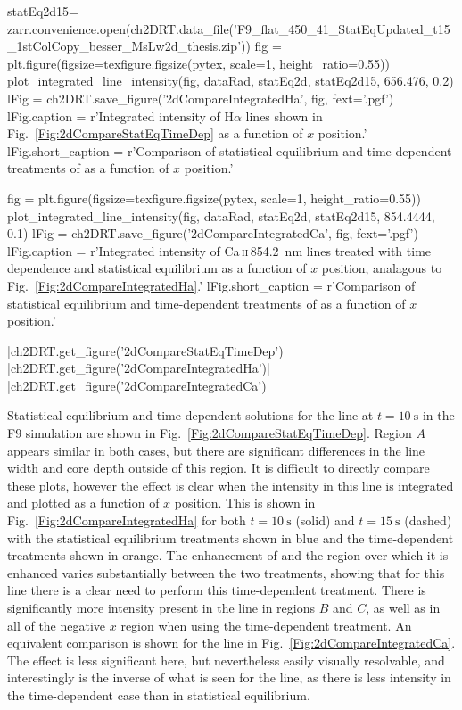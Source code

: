 \begin{pycode}[2DRT]
statEq2d15= zarr.convenience.open(ch2DRT.data_file('F9_flat_450_41_StatEqUpdated_t15_1stColCopy_besser_MsLw2d_thesis.zip'))
fig = plt.figure(figsize=texfigure.figsize(pytex, scale=1, height_ratio=0.55))
plot_integrated_line_intensity(fig, dataRad, statEq2d, statEq2d15, 656.476, 0.2)
lFig = ch2DRT.save_figure('2dCompareIntegratedHa', fig, fext='.pgf')
lFig.caption = r'Integrated intensity of H$\alpha$ lines shown in Fig.~\ref{Fig:2dCompareStatEqTimeDep} as a function of $x$ position.'
lFig.short_caption = r'Comparison of statistical equilibrium and time-dependent treatments of \Ha{} as a function of $x$ position.'

fig = plt.figure(figsize=texfigure.figsize(pytex, scale=1, height_ratio=0.55))
plot_integrated_line_intensity(fig, dataRad, statEq2d, statEq2d15, 854.4444, 0.1)
lFig = ch2DRT.save_figure('2dCompareIntegratedCa', fig, fext='.pgf')
lFig.caption = r'Integrated intensity of Ca\,\textsc{ii}\,\SI{854.2}{\nano\metre} lines treated with time dependence and statistical equilibrium as a function of $x$ position, analagous to Fig.~\ref{Fig:2dCompareIntegratedHa}.'
lFig.short_caption = r'Comparison of statistical equilibrium and time-dependent treatments of \CaLine{} as a function of $x$ position.'

\end{pycode}

\py[2DRT]|ch2DRT.get_figure('2dCompareStatEqTimeDep')|
\py[2DRT]|ch2DRT.get_figure('2dCompareIntegratedHa')|
\py[2DRT]|ch2DRT.get_figure('2dCompareIntegratedCa')|

Statistical equilibrium and time-dependent solutions for the \Ha{} line at $t=\SI{10}{\second}$ in the F9 simulation are shown in Fig.~\ref{Fig:2dCompareStatEqTimeDep}.
Region $A$ appears similar in both cases, but there are significant differences in the line width and core depth outside of this region.
It is difficult to directly compare these plots, however the effect is clear when the intensity in this line is integrated and plotted as a function of $x$ position.
This is shown in Fig.~\ref{Fig:2dCompareIntegratedHa} for both $t=\SI{10}{\second}$ (solid) and $t=\SI{15}{\second}$ (dashed) with the statistical equilibrium treatments shown in blue and the time-dependent treatments shown in orange.
The enhancement of \Ha{} and the region over which it is enhanced varies substantially between the two treatments, showing that for this line there is a clear need to perform this time-dependent treatment.
There is significantly more intensity present in the line in regions $B$ and $C$, as well as in all of the negative $x$ region when using the time-dependent treatment.
An equivalent comparison is shown for the \CaLine{} line in Fig.~\ref{Fig:2dCompareIntegratedCa}.
The effect is less significant here, but nevertheless easily visually resolvable, and interestingly is the inverse of what is seen for the \Ha{} line, as there is less intensity in the time-dependent case than in statistical equilibrium.

